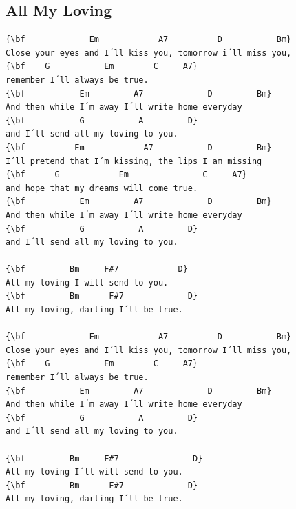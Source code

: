 \documentclass[a4paper]{article}
\begin{document}
\subsection{All My Loving}
\begin{Verbatim}[commandchars=\\\{\}]
{\bf             Em            A7          D           Bm}
Close your eyes and I´ll kiss you, tomorrow i´ll miss you,
{\bf    G           Em        C     A7}
remember I´ll always be true.
{\bf           Em         A7             D         Bm}
And then while I´m away I´ll write home everyday
{\bf           G           A         D}
and I´ll send all my loving to you.
{\bf          Em            A7           D         Bm}
I´ll pretend that I´m kissing, the lips I am missing
{\bf      G            Em               C     A7}
and hope that my dreams will come true.
{\bf           Em         A7             D         Bm}
And then while I´m away I´ll write home everyday
{\bf           G           A         D}
and I´ll send all my loving to you.

{\bf         Bm     F#7            D}
All my loving I will send to you.
{\bf         Bm      F#7             D}
All my loving, darling I´ll be true.

{\bf             Em            A7          D           Bm}
Close your eyes and I´ll kiss you, tomorrow I´ll miss you,
{\bf    G           Em        C     A7}
remember I´ll always be true.
{\bf           Em         A7             D         Bm}
And then while I´m away I´ll write home everyday
{\bf           G           A         D}
and I´ll send all my loving to you.

{\bf         Bm     F#7               D}
All my loving I´ll will send to you.
{\bf         Bm      F#7             D}
All my loving, darling I´ll be true.

\end{Verbatim}
\newpage
\end{document}
